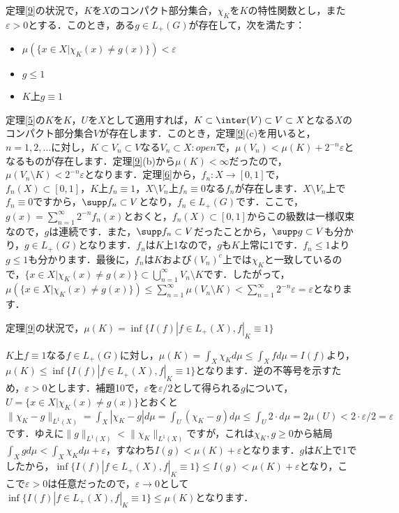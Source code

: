 \begin{lem}\label{10}
定理\ref{9}の状況で，$K$を$X$のコンパクト部分集合，$\chi_{K}$を$K$の特性関数とし，また$\varepsilon >0$とする．このとき，ある$g \in L_{+}(G)$が存在して，次を満たす：
\begin{itemize}
 \item $\mu ( \{ x \in X | \chi_{K}(x) \neq g(x) \} ) < \varepsilon $
 \item $g \le 1$
 \item $K$上$g \equiv 1$
\end{itemize}
\end{lem}
\begin{Proof}
定理\ref{5}の$K$を$K$，$U$を$X$として適用すれば，$K \subset \inter(V) \subset V \subset X$となる$X$のコンパクト部分集合$V$が存在します．このとき，定理\ref{9}(c)を用いると，$n=1,2,\ldots$に対し，$K \subset V_n \subset V$なる$V_n \subset X \colon open$で，$\mu(V_n) < \mu(K) + 2^{-n}\varepsilon$となるものが存在します．定理\ref{9}(b)から$\mu(K)<\infty$だったので，$\mu(V_n \setminus K) < 2^{-n}\varepsilon$となります．定理\ref{6}から，$f_n \colon X \to [0,1]$で，$f_n(X) \subset [0,1]$，$K$上$f_n \equiv 1$，$X \setminus V_n$上$f_n \equiv 0$なる$f_n$が存在します．$X \setminus V_{n}$上で$f_{n} \equiv 0$ですから，$\supp f_{n} \subset V$となり，$f_{n} \in L_{+}(G)$です．ここで，$g(x)=\sum_{n=1}^{\infty}2^{-n}f_n(x)$とおくと，$f_{n}(X) \subset [0,1]$からこの級数は一様収束なので，$g$は連続です．また，$\supp f_{n} \subset V$だったことから，$\supp g \subset V$も分かり，$g \in L_{+}(G)$となります．$f_n$は$K$上1なので，$g$も$K$上常に1です．$f_n \le 1$より$g \le 1$も分かります．最後に，$f_n$は$K$および$(V_n)^{c}$上では$\chi_{K}$と一致しているので，$\{ x \in X | \chi_{K}(x) \neq g(x) \} \subset \bigcup_{n=1}^{\infty}V_n \setminus K$です．したがって，$\mu( \{ x \in X | \chi_{K}(x) \neq g(x) \} ) \le \sum_{n=1}^{\infty} \mu(V_n \setminus K) < \sum_{n=1}^{\infty}2^{-n}\varepsilon=\varepsilon$となります．
\end{Proof}
\begin{prop}\label{11}
定理\ref{9}の状況で，$\mu(K)= \inf \{ I(f) | f \in L_{+}(X), f|_{K} \equiv 1 \}$
\end{prop}
\begin{Proof}
$K$上$f \equiv 1$なる$f \in L_{+}(G)$に対し，$ \mu(K)=\int_{X}\chi_K d\mu \le \int_{X}f d\mu=I(f)$より，$\mu(K) \le \inf \{ I(f) | f \in L_{+}(X), f|_{K} \equiv 1 \}$となります．逆の不等号を示すため，$\varepsilon>0$とします．補題10で，$\varepsilon$を$\varepsilon /2$として得られる$g$について，$U=\{ x \in X | \chi_{K}(x) \neq g(x) \}$とおくと$\| \chi_{K}-g\| _{L^1(X)} = \int_{X}|\chi_K-g|d\mu = \int_{U}(\chi_K-g)d\mu \le \int_{U}2 \cdot d\mu=2\mu(U)<2 \cdot \varepsilon / 2=\varepsilon$です．ゆえに$\| g\|  _{L^1(X)} < \| \chi_{K} \| _{L^1(X)} $ですが，これは$\chi_K, g \ge 0$から結局 $\int_{X}gd\mu < \int_{X}\chi_{K}d\mu +\varepsilon$，すなわち$I(g)<\mu (K)+\varepsilon$となります．$g$は$K$上で1でしたから，$\inf \{ I(f) | f \in L_{+}(X), f|_{K} \equiv 1 \} \le I(g) <\mu (K)+\varepsilon$となり，ここで$\varepsilon>0$は任意だったので，$\varepsilon \to 0$として $\inf \{ I(f) | f \in L_{+}(X), f|_{K} \equiv 1 \} \le \mu (K)$となります．
\end{Proof}

